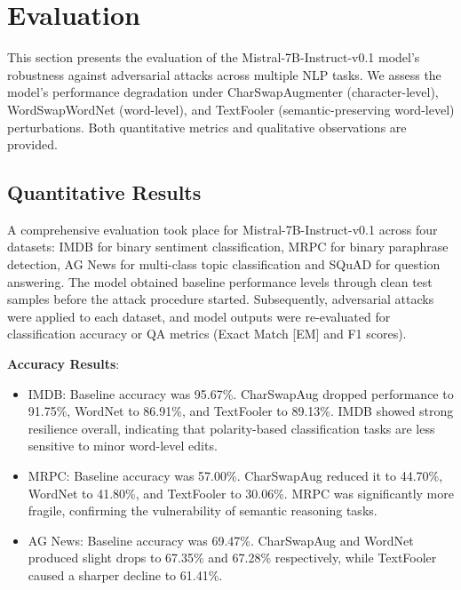 \documentclass[conference]{IEEEtran}
\begin{document}
\section{Evaluation}

This section presents the evaluation of the Mistral-7B-Instruct-v0.1 model's robustness against adversarial attacks across multiple NLP tasks. We assess the model’s performance degradation under CharSwapAugmenter (character-level), WordSwapWordNet (word-level), and TextFooler (semantic-preserving word-level) perturbations. Both quantitative metrics and qualitative observations are provided.

\subsection{Quantitative Results}


A comprehensive evaluation took place for Mistral-7B-Instruct-v0.1 across four datasets: IMDB for binary sentiment classification, MRPC for binary paraphrase detection, AG News for multi-class topic classification and SQuAD for question answering. The model obtained baseline performance levels through clean test samples before the attack procedure started. Subsequently, adversarial attacks were applied to each dataset, and model outputs were re-evaluated for classification accuracy or QA metrics (Exact Match [EM] and F1 scores).

\textbf{Accuracy Results}:
\begin{itemize}
    \item IMDB: Baseline accuracy was 95.67\%. CharSwapAug dropped performance to 91.75\%, WordNet to 86.91\%, and TextFooler to 89.13\%. IMDB showed strong resilience overall, indicating that polarity-based classification tasks are less sensitive to minor word-level edits.
    \item MRPC: Baseline accuracy was 57.00\%. CharSwapAug reduced it to 44.70\%, WordNet to 41.80\%, and TextFooler to 30.06\%. MRPC was significantly more fragile, confirming the vulnerability of semantic reasoning tasks.
    \item AG News: Baseline accuracy was 69.47\%. CharSwapAug and WordNet produced slight drops to 67.35\% and 67.28\% respectively, while TextFooler caused a sharper decline to 61.41\%.
\end{itemize}
\end{document}
